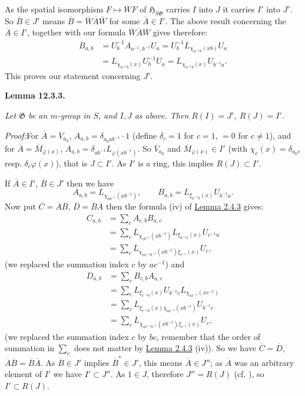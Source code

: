 \documentclass[12pt,b5paper,twoside]{article}
\newcommand{\Hspace}{\mathfrak H}
\newcommand{\Lemma}[1]{%
  \par\smallskip\noindent\phantomsection\label{lem:#1}\textbf{Lemma #1.}\enspace
}
\newcommand{\Proof}{\par\noindent\textit{Proof:}\enspace}
\newcommand{\lemref}[1]{\hyperref[lem:#1]{Lemma #1}}
\begin{document}
As the spatial isomorphism $F\mapsto\overline WF$ of
$\Hspace_{S\mathfrak G}$ carries $I$ into $J$ it carries $I'$ into $J'$. So
$\overline B\in J'$ means $\overline B=\overline W\overline A\overline W$
for some $\overline A\in I'$. The above result concerning the
$\overline A\in I'$, together with our formula
$\overline W\overline A\overline W$ gives therefore:
\begin{align*}
 B_{a,b}
 &=U_b^{-1}A_{a^{-1},b^{-1}}U_a
 =U_b^{-1}L_{\chi_{a^{-1}b}(xb)}U_a\\
 &=L_{\chi_{a^{-1}b}(x)}U_b^{-1}U_a
 =L_{\chi_{a^{-1}b}(x)}U_{b^{-1}a}.
\end{align*}
This proves our statement concerning $J'$.

\Lemma{12.3.3}
\emph{Let $\mathfrak G$ be an $m$-group in $S$, and $I,J$ as above. Then
$R(I)=J'$, $R(J)=I'$.}

\Proof For $\overline A=\overline V_{a_0}$,
$A_{a,b}=\delta_{a_0ab^{-1}}\cdot1$ (define
$\delta_c=1$ for $c=1$, $=0$ for $c\neq1$), and for
$\overline A=\overline M_{\varphi(x)}$,
$A_{a,b}=\delta_{ab^{-1}}L_{\varphi(xb^{-1})}$. So
$\overline V_{a_0}$ and $\overline M_{\varphi(x)}\in I'$ (with
$\chi_c(x)=\delta_{a_0c}$ resp. $\delta_c\varphi(x)$), that is $J\subset I'$.
As $I'$ is a ring, this implies $R(J)\subset I'$.

If $\overline A\in I'$, $\overline B\in J'$ then we have
\[
 A_{a,b}=L_{\chi_{ab^{-1}}(xb^{-1})},
 \qquad
 B_{a,b}=L_{\xi_{a^{-1}b}(x)}U_{b^{-1}a}.
\]
Now put $\overline C=\overline A\overline B$,
$\overline D=\overline B\overline A$ then the formula (iv) of
\lemref{2.4.3} gives:
\begin{align*}
 C_{a,b}
 &=\sum_cA_{c,b}B_{a,c}\\
 &=\sum_cL_{\chi_{cb^{-1}}(xb^{-1})}
          L_{\xi_{a^{-1}c}(x)}U_{c^{-1}a}\\
 &=\sum_cL_{\chi_{ac^{-1}b^{-1}}(xb^{-1})\xi_{c^{-1}}(x)}U_c,
\end{align*}
(we replaced the summation index $c$ by $ac^{-1}$) and
\begin{align*}
 D_{a,b}
 &=\sum_cB_{c,b}A_{a,c}\\
 &=\sum_cL_{\xi_{c^{-1}b}(x)}U_{b^{-1}c}
          L_{\chi_{ac^{-1}}(xc^{-1})}\\
 &=\sum_cL_{\xi_{c^{-1}b}(x)\chi_{ac^{-1}}(xb^{-1})}U_{b^{-1}c}\\
 &=\sum_cL_{\chi_{ac^{-1}b^{-1}}(xb^{-1})\xi_{c^{-1}}(x)}U_c,
\end{align*}
(we replaced the summation index $c$ by $bc$, remember that the order of
summation in $\sum_c$ does not matter by \lemref{2.4.3} (iv)). So we have
$\overline C=\overline D$, $\overline A\overline B=\overline B\overline A$.
As $\overline B\in J'$ implies $\overline B^*\in J'$, this means
$\overline A\in J''$; as $\overline A$ was an arbitrary element of $I'$ we
have $I'\subset J''$. As $1\in J$, therefore $J''=R(J)$
(cf. \cite[p.~397]{ref18}), so $I'\subset R(J)$.
\end{document}
